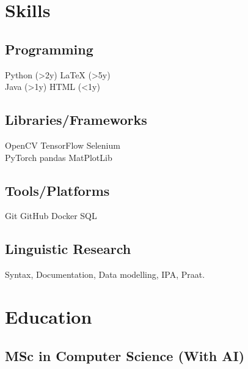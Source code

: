 \documentclass[]{plushcv}
\begin{document}
\begin{minipage}[t]{0.25\textwidth} 


\section{Skills}
\subsection{Programming}
\sectionsep
{} 
Python (>2y) \textbullet{} LaTeX (>5y)  \\
\sectionsep
{}
Java (>1y) \textbullet{}  HTML (<1y) \\
\sectionsep
\subsection{Libraries/Frameworks}
\sectionsep
OpenCV \textbullet{} TensorFlow \textbullet{} Selenium\\
PyTorch \textbullet{} pandas \textbullet{} MatPlotLib \\
\sectionsep
\subsection{Tools/Platforms}
\sectionsep
Git \textbullet{} GitHub \textbullet{} Docker \textbullet{} SQL \\
\sectionsep
\subsection{Linguistic Research}
\sectionsep
Syntax, Documentation, Data modelling, IPA, Praat.
\sectionsep


\section{Education} 

\subsection{MSc in Computer Science (With AI)}


\end{minipage}
\end{document}
